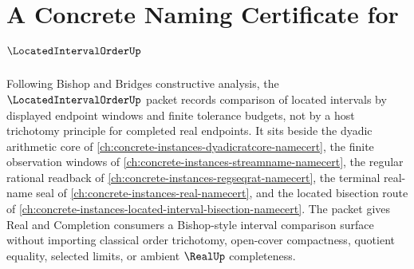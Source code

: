 \chapter{A Concrete Naming Certificate for $\LocatedIntervalOrderUp$}
\label{ch:concrete-instances-located-interval-order-namecert}

Following Bishop and Bridges constructive analysis, the $\LocatedIntervalOrderUp$ packet records comparison of located intervals by displayed endpoint windows and finite tolerance budgets, not by a host trichotomy principle for completed real endpoints. It sits beside the dyadic arithmetic core of \autoref{ch:concrete-instances-dyadicratcore-namecert}, the finite observation windows of \autoref{ch:concrete-instances-streamname-namecert}, the regular rational readback of \autoref{ch:concrete-instances-regseqrat-namecert}, the terminal real-name seal of \autoref{ch:concrete-instances-real-namecert}, and the located bisection route of \autoref{ch:concrete-instances-located-interval-bisection-namecert}. The packet gives Real and Completion consumers a Bishop-style interval comparison surface without importing classical order trichotomy, open-cover compactness, quotient equality, selected limits, or ambient $\RealUp$ completeness.

